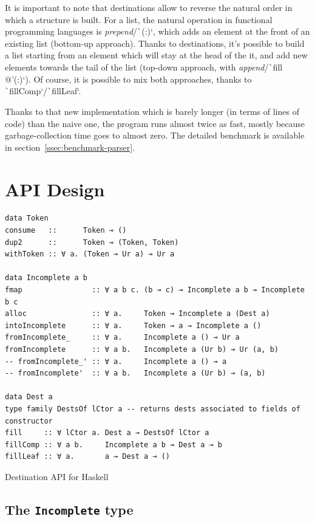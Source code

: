 \documentclass[english]{jflart}
\begin{document}
It is important to note that destinations allow to reverse the natural order in which a structure is built. For a list, the natural operation in functional programming languages is \emph{prepend}/\texttt`(:)`, which adds an element at the front of an existing list (bottom-up approach). Thanks to destinations, it's possible to build a list starting from an element which will stay at the head of the it, and add new elements towards the tail of the list (top-down approach, with \emph{append}/\texttt`fill @'(:)`). Of course, it is possible to mix both approaches, thanks to \texttt`fillComp`/\texttt`fillLeaf`.

Thanks to that new implementation which is barely longer (in terms of lines of code) than the naive one, the program runs almost twice as fast, mostly because garbage-collection time goes to almost zero. The detailed benchmark is available in section~\ref{ssec:benchmark-parser}.


\section{API Design}\label{sec:api}

\begin{table}[t]
\small
\begin{verbatim}
data Token
consume   ::      Token ⊸ ()
dup2      ::      Token ⊸ (Token, Token)
withToken :: ∀ a. (Token ⊸ Ur a) ⊸ Ur a

data Incomplete a b
fmap                :: ∀ a b c. (b ⊸ c) ⊸ Incomplete a b ⊸ Incomplete b c
alloc               :: ∀ a.     Token ⊸ Incomplete a (Dest a)
intoIncomplete      :: ∀ a.     Token ⊸ a → Incomplete a ()
fromIncomplete_     :: ∀ a.     Incomplete a () ⊸ Ur a
fromIncomplete      :: ∀ a b.   Incomplete a (Ur b) ⊸ Ur (a, b)
-- fromIncomplete_' :: ∀ a.     Incomplete a () ⊸ a
-- fromIncomplete'  :: ∀ a b.   Incomplete a (Ur b) ⊸ (a, b)

data Dest a
type family DestsOf lCtor a -- returns dests associated to fields of constructor
fill     :: ∀ lCtor a. Dest a → DestsOf lCtor a
fillComp :: ∀ a b.     Incomplete a b ⊸ Dest a ⊸ b
fillLeaf :: ∀ a.       a → Dest a ⊸ ()
\end{verbatim}
\caption{Destination API for Haskell}
\label{table:destination-api}
\end{table}

\subsection{The \texttt{Incomplete} type}
\end{document}
